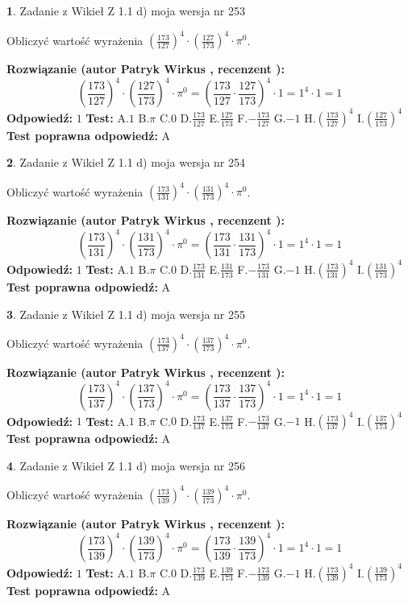 \documentclass[12pt, a4paper]{article}
\theoremstyle{definition} %
\newtheorem{zad}{}
\newcommand{\zadStart}[1]{\begin{zad}#1\newline}
\newcommand{\zadStop}{\end{zad}}
\newcommand{\rozwStart}[2]{\noindent \textbf{Rozwiązanie (autor #1 , recenzent #2): }\newline}
\newcommand{\rozwStop}{\newline}
\newcommand{\odpStart}{\noindent \textbf{Odpowiedź:}\newline}
\newcommand{\odpStop}{\newline}
\newcommand{\testStart}{\noindent \textbf{Test:}\newline}
\newcommand{\testStop}{\newline}
\newcommand{\kluczStart}{\noindent \textbf{Test poprawna odpowiedź:}\newline}
\newcommand{\kluczStop}{\newline}
\begin{document}
\zadStart{Zadanie z Wikieł Z 1.1 d) moja wersja nr 253}

Obliczyć wartość wyrażenia $(\frac{173}{127})^{4} \cdot (\frac{127}{173})^{4} \cdot \pi^{0}$.
\zadStop
\rozwStart{Patryk Wirkus}{}
$$(\frac{173}{127})^{4} \cdot (\frac{127}{173})^{4} \cdot \pi^{0} = (\frac{173}{127} \cdot \frac{127}{173})^{4} \cdot 1 = 1^{4} \cdot 1 = 1$$
\rozwStop
\odpStart
$1$
\odpStop
\testStart
A.$1$ B.$\pi$ C.$0$ D.$\frac{173}{127}$ E.$\frac{127}{173}$
F.$-\frac{173}{127}$ G.$-1$
H.$(\frac{173}{127})^{4}$
I.$(\frac{127}{173})^{4}$
\testStop
\kluczStart
A
\kluczStop



\zadStart{Zadanie z Wikieł Z 1.1 d) moja wersja nr 254}

Obliczyć wartość wyrażenia $(\frac{173}{131})^{4} \cdot (\frac{131}{173})^{4} \cdot \pi^{0}$.
\zadStop
\rozwStart{Patryk Wirkus}{}
$$(\frac{173}{131})^{4} \cdot (\frac{131}{173})^{4} \cdot \pi^{0} = (\frac{173}{131} \cdot \frac{131}{173})^{4} \cdot 1 = 1^{4} \cdot 1 = 1$$
\rozwStop
\odpStart
$1$
\odpStop
\testStart
A.$1$ B.$\pi$ C.$0$ D.$\frac{173}{131}$ E.$\frac{131}{173}$
F.$-\frac{173}{131}$ G.$-1$
H.$(\frac{173}{131})^{4}$
I.$(\frac{131}{173})^{4}$
\testStop
\kluczStart
A
\kluczStop



\zadStart{Zadanie z Wikieł Z 1.1 d) moja wersja nr 255}

Obliczyć wartość wyrażenia $(\frac{173}{137})^{4} \cdot (\frac{137}{173})^{4} \cdot \pi^{0}$.
\zadStop
\rozwStart{Patryk Wirkus}{}
$$(\frac{173}{137})^{4} \cdot (\frac{137}{173})^{4} \cdot \pi^{0} = (\frac{173}{137} \cdot \frac{137}{173})^{4} \cdot 1 = 1^{4} \cdot 1 = 1$$
\rozwStop
\odpStart
$1$
\odpStop
\testStart
A.$1$ B.$\pi$ C.$0$ D.$\frac{173}{137}$ E.$\frac{137}{173}$
F.$-\frac{173}{137}$ G.$-1$
H.$(\frac{173}{137})^{4}$
I.$(\frac{137}{173})^{4}$
\testStop
\kluczStart
A
\kluczStop



\zadStart{Zadanie z Wikieł Z 1.1 d) moja wersja nr 256}

Obliczyć wartość wyrażenia $(\frac{173}{139})^{4} \cdot (\frac{139}{173})^{4} \cdot \pi^{0}$.
\zadStop
\rozwStart{Patryk Wirkus}{}
$$(\frac{173}{139})^{4} \cdot (\frac{139}{173})^{4} \cdot \pi^{0} = (\frac{173}{139} \cdot \frac{139}{173})^{4} \cdot 1 = 1^{4} \cdot 1 = 1$$
\rozwStop
\odpStart
$1$
\odpStop
\testStart
A.$1$ B.$\pi$ C.$0$ D.$\frac{173}{139}$ E.$\frac{139}{173}$
F.$-\frac{173}{139}$ G.$-1$
H.$(\frac{173}{139})^{4}$
I.$(\frac{139}{173})^{4}$
\testStop
\kluczStart
A
\kluczStop
\end{document}
